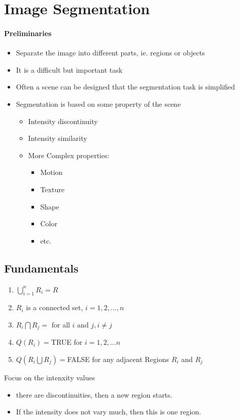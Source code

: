 \section{Image Segmentation}
\paragraph{Preliminaries}
\begin{itemize}
\item Separate the image into different parts, ie. regions or objects
\item It is a difficult but important task
\item Often a scene can be designed that the segmentation task is simplified
\item Segmentation is based on some property of the scene
\begin{itemize}
\item Intensity discontinuity
\item Intensity similarity
\item More Complex properties:
\begin{itemize}
\item Motion
\item Texture
\item Shape
\item Color
\item etc.
\end{itemize}
\end{itemize}
\end{itemize}

\subsection{Fundamentals}
\begin{enumerate}
\item $\bigcup\limits_{i=1}^{n}R_i=R$
\item $R_i$ is a connected set, $i=1,2,...,n$
\item $R_i\bigcap R_j = $ for all $i$ and $j, i\neq j$
\item $Q(R_i)=$TRUE for $i=1,2,...n$
\item $Q(R_i\bigcup R_j)=$FALSE for any adjacent Regions $R_i$ and $R_j$
\end{enumerate}
Focus on the intenxity values
\begin{itemize}
\item there are discontinuities, then a new region starts.
\item If the intensity does not vary much, then this is one region.
\end{itemize}

